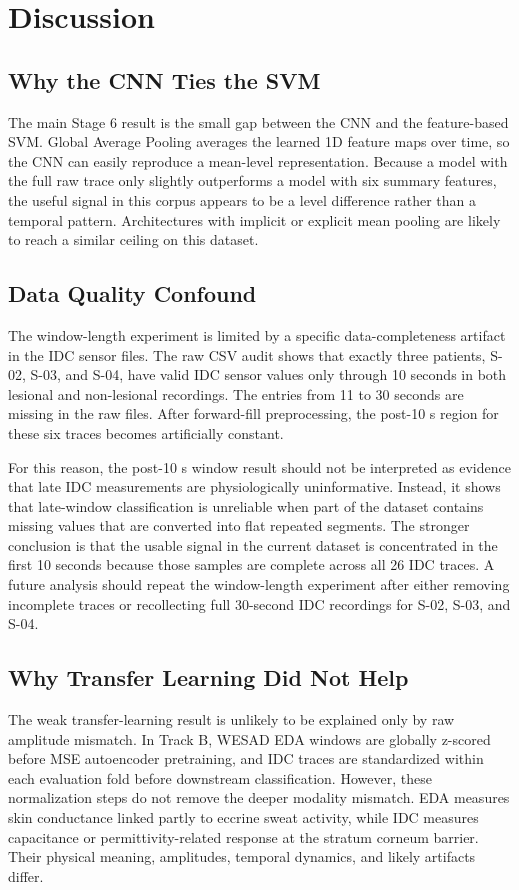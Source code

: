 \documentclass[acmtog]{acmart}
\begin{document}
\section{Discussion}\label{sec:discussion}

\subsection{Why the CNN Ties the SVM}
The main Stage 6 result is the small gap between the CNN and the feature-based
SVM. Global Average Pooling averages the learned 1D feature maps over time, so
the CNN can easily reproduce a mean-level representation. Because a model with
the full raw trace only slightly outperforms a model with six summary features,
the useful signal in this corpus appears to be a level difference rather than a
temporal pattern. Architectures with implicit or explicit mean pooling are likely
to reach a similar ceiling on this dataset.


\subsection{Data Quality Confound}
The window-length experiment is limited by a specific data-completeness artifact
in the IDC sensor files. The raw CSV audit shows that exactly three patients,
S-02, S-03, and S-04, have valid IDC sensor values only through 10 seconds in
both lesional and non-lesional recordings. The entries from 11 to 30 seconds are
missing in the raw files. After forward-fill preprocessing, the post-10 s region
for these six traces becomes artificially constant.

For this reason, the post-10 s window result should not be interpreted as
evidence that late IDC measurements are physiologically uninformative. Instead,
it shows that late-window classification is unreliable when part of the dataset
contains missing values that are converted into flat repeated segments. The
stronger conclusion is that the usable signal in the current dataset is
concentrated in the first 10 seconds because those samples are complete across
all 26 IDC traces. A future analysis should repeat the window-length experiment
after either removing incomplete traces or recollecting full 30-second IDC
recordings for S-02, S-03, and S-04.


\subsection{Why Transfer Learning Did Not Help}
The weak transfer-learning result is unlikely to be explained only by raw
amplitude mismatch. In Track B, WESAD EDA windows are globally z-scored before
MSE autoencoder pretraining, and IDC traces are standardized within each
evaluation fold before downstream classification. However, these normalization
steps do not remove the deeper modality mismatch. EDA measures skin conductance
linked partly to eccrine sweat activity, while IDC measures capacitance or
permittivity-related response at the stratum corneum barrier. Their physical
meaning, amplitudes, temporal dynamics, and likely artifacts differ.
\end{document}
